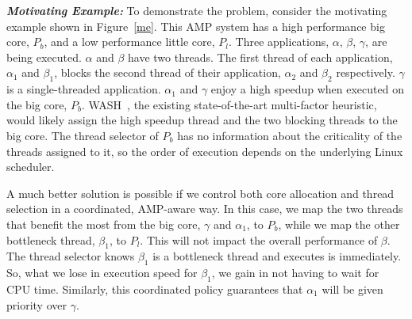 \textbf{\textit{Motivating Example:}} To demonstrate the problem, consider the motivating example shown in Figure~\ref{me}. This AMP system has a high performance big core, $P_b$, and a low performance little core, $P_l$. Three applications, {$\alpha$, $\beta$, $\gamma$}, are being executed. $\alpha$ and $\beta$ have two threads.
The first thread of each application, $\alpha_1$ and $\beta_1$, blocks the second thread of their application, $\alpha_2$ and $\beta_2$ respectively. $\gamma$ is a single-threaded application. $\alpha_1$ and $\gamma$ enjoy a high speedup when executed on the big core, $P_b$. WASH~\cite{jibaja2016portable}, the existing state-of-the-art multi-factor heuristic, would likely assign the high speedup thread and the two blocking threads to the big core. The thread selector of $P_b$ has no information about the criticality of the threads assigned to it, so the order of execution depends on the underlying Linux scheduler.

A much better solution is possible if we control both core allocation and thread selection in a coordinated, AMP-aware way. In this case, we map the two threads that benefit the most from the big core, $\gamma$ and $\alpha_1$, to $P_b$, while we map the other bottleneck thread, $\beta_1$, to $P_l$. This will not impact the overall performance of $\beta$. The thread selector knows $\beta_1$ is a bottleneck thread and executes is immediately. So, what we lose in execution speed for $\beta_1$, we gain in not having to wait for CPU time. Similarly, this coordinated policy guarantees that $\alpha_1$ will be given priority over $\gamma$. 


